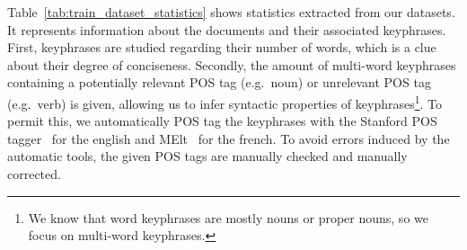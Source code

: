     Table~\ref{tab:train_dataset_statistics} shows statistics extracted from our
    datasets. It represents information about the documents and their associated
    keyphrases. First, keyphrases are studied regarding their number of words,
    which is a clue about their degree of conciseness. Secondly, the amount of
    multi-word keyphrases containing a potentially relevant POS tag (e.g.~noun)
    or unrelevant POS tag (e.g.~verb) is given, allowing us to infer syntactic
    properties of keyphrases\footnote{We know that word keyphrases are mostly
    nouns or proper nouns, so we focus on multi-word keyphrases.}. To permit
    this, we automatically POS tag the keyphrases with the Stanford POS
    tagger~\cite{toutanova2003stanfordpostagger} for the english and
    MElt~\cite{denis2009melt} for the french. To avoid errors induced by the
    automatic tools, the given POS tags are manually checked and manually
    corrected.
